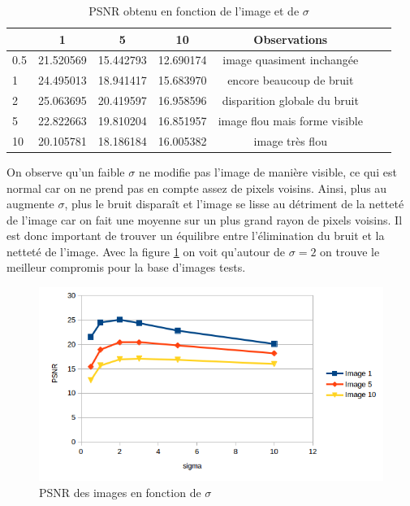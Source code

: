 \documentclass[paper=a4, fontsize=11pt]{scrartcl} %
\begin{document}
\begin{table}[h!]
\caption{PSNR obtenu en fonction de l'image et de $\sigma$}
\begin{tabular}{|l|c|c|c|c|c|c|}

	\hline
	\backslashbox{$\sigma$}{Numéro image} & 1 & 5 & 10 & Observations\\ 
	\hline
	
	0.5 & 21.520569 & 15.442793 & 12.690174 & image quasiment inchangée \\
	\hline
	1 & 24.495013 & 18.941417 & 15.683970 & encore beaucoup de bruit\\
	\hline
	2 & 25.063695 & 20.419597 & 16.958596 &  disparition globale du bruit \\
	\hline
	5 & 22.822663 & 19.810204 & 16.851957 & image flou mais forme visible \\ 
	\hline
	10 & 20.105781  & 18.186184 & 16.005382 & image très flou \\
	\hline

\end{tabular}

\end{table}
On observe qu'un faible $\sigma$ ne modifie pas l'image de manière visible, ce qui est normal car on ne prend pas en compte assez de pixels voisins. Ainsi, plus au augmente $\sigma$, plus le bruit disparaît et l'image se lisse au détriment de la netteté de l'image car on fait une moyenne sur un plus grand rayon de pixels voisins. Il est donc important de trouver un équilibre entre l'élimination du bruit et la netteté de l'image. Avec la figure \ref{tracer1} on voit qu'autour de $\sigma=2$ on trouve le meilleur compromis pour la base d'images tests.

\begin{figure}[h!]
\centering
\caption{PSNR des images en fonction de $\sigma$}
\label{tracer1}
\includegraphics[scale=1]{images/rapport/courbes/pnsr1.png}
\end{figure}
\end{document}
